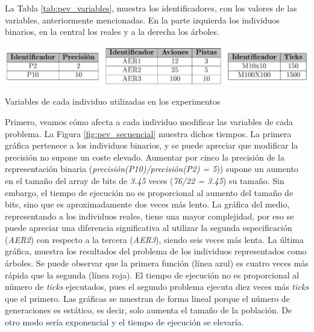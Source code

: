 


La Tabla \ref{tab:pev_variables}, muestra los identificadores, con los valores de las variables, anteriormente mencionadas. En la parte izquierda los individuos binarios, en la central los reales y a la derecha los árboles.

\begin{table}[!h]
	\centering
	\includegraphics[width=1\textwidth]{images/chapter_4/tab_pev_variables}		
	\caption{Variables de cada individuo utilizadas en los experimentos}
	\label{tab:pev_variables}
\end{table}		


Primero, veamos cómo afecta a cada individuo modificar las variables de cada problema. La Figura \ref{fig:pev_secuencial} muestra dichos tiempos. La primera gráfica pertenece a los individuos binarios, y se puede apreciar que modificar la precisión no supone un coste elevado. Aumentar por cinco la precisión de la representación binaria (\textit{precisión(P10)/precisión(P2) = 5})) supone un aumento en el tamaño del array de bits de \textit{3.45} veces (\textit{76/22 = 3.45}) su tamaño. Sin embargo, el tiempo de ejecución no es proporcional al aumento del tamaño de bits, sino que es aproximadamente dos veces más lento. La gráfica del medio, representando a los individuos reales, tiene una mayor complejidad, por eso se puede apreciar una diferencia significativa al utilizar la segunda especificación (\textit{AER2}) con respecto a la tercera (\textit{AER3}), siendo seis veces más lenta. La última gráfica, muestra los resultados del problema de los individuos representados como árboles. Se puede observar que la primera función (línea azul) es cuatro veces más rápida que la segunda (línea roja). El tiempo de ejecución no es proporcional al número de \textit{ticks} ejecutados, pues el segundo problema ejecuta diez veces más \textit{ticks} que el primero. Las gráficas se muestran de forma lineal porque el número de generaciones es estático, es decir, solo aumenta el tamaño de la población. De otro modo sería exponencial y el tiempo de ejecución se elevaría.





